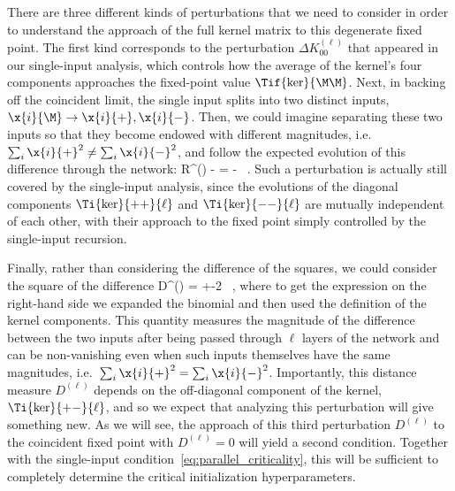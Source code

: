 There are three different kinds of perturbations that we need to consider in order to understand the approach of the full kernel matrix to this degenerate fixed point. 
The first kind corresponds to the perturbation $\Delta K^{(\ell)}_{00}$ that appeared in our single-input analysis, which controls how the average of the kernel's four components approaches the fixed-point value $\Tif{\ker}{\M\M}$. Next, in backing off the coincident limit, the single input splits into two distinct inputs, $\x{i}{\M} \to \x{i}{+},\x{i}{-}$. Then, we could imagine separating these two inputs so that they become endowed with different magnitudes, i.e.~$\sum_i \x{i}{+}^2 \neq \sum_i \x{i}{-}^2$, and follow the expected evolution of this difference through the network:
\be\label{eq:radial-distance-def}
R^{(\ell)}  \equiv {} - = \Ti{\ker}{++}{\ell}-\Ti{\ker}{--}{\ell} \, .
\ee
Such a perturbation is actually still covered by the single-input analysis, since the evolutions of the diagonal components $\Ti{\ker}{++}{\ell}$ and $\Ti{\ker}{--}{\ell}$ are mutually independent of each other, with their approach to the fixed point simply controlled by the single-input recursion.

Finally, rather than considering the difference of the squares, we could consider the square of the difference
\be\label{eq:distance-def}
D^{(\ell)}  \equiv {} = \Ti{\ker}{++}{\ell}+\Ti{\ker}{--}{\ell}-2\Ti{\ker}{+-}{\ell} \, ,
\ee
where to get the expression on the right-hand side we expanded the binomial and then used the definition of the kernel components.
This quantity measures the magnitude of the difference between the two inputs after being passed through $\ell$ layers of the network and can be non-vanishing even when such inputs themselves have the same magnitudes, i.e.~$\sum_i \x{i}{+}^2 = \sum_i \x{i}{-}^2$.
Importantly, this distance measure $D^{(\ell)}$ depends on the 
off-diagonal component of the kernel, $\Ti{\ker}{+-}{\ell}$, and so we expect that analyzing this perturbation will give something new. As we will see, the approach of this third perturbation $D^{(\ell)}$ to the coincident fixed point with $D^{(\ell)}=0$ will yield a second  condition.  Together with the single-input  condition~\eqref{eq:parallel_criticality}, this will be sufficient to completely determine the critical initialization hyperparameters.






